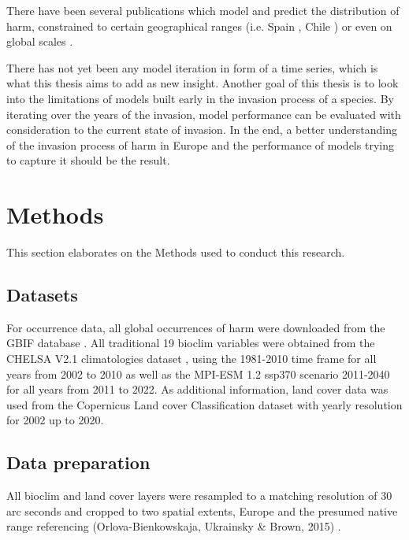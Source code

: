 \documentclass[12pt,a4paper]{article}
\begin{document}
There have been several publications which model and predict the distribution of \gls{harm}, constrained to certain geographical ranges (i.e. Spain \autocite{ameixa2019harmSDMSpain}, Chile \autocite{alaniz2018harmSDMChile}) or even on global scales \autocite{bidinger2012harmSDMglobalMaxent, poutsma2008harmSDMglobalClimex}.

There has not yet been any model iteration in form of a time series, which is what this thesis aims to add as new insight.
Another goal of this thesis is to look into the limitations of models built early in the invasion process of a species.
By iterating over the years of the invasion, model performance can be evaluated with consideration to the current state of invasion.
In the end, a better understanding of the invasion process of \gls{harm} in Europe and the performance of models trying to capture it should be the result.



\newpage
\section{Methods}
This section elaborates on the Methods used to conduct this research.

\subsection{Datasets}
For occurrence data, all global occurrences of \gls{harm} were downloaded from the GBIF database \autocite{GBIFaxyridisdataset}.
All traditional 19 bioclim variables were obtained from the CHELSA V2.1 climatologies dataset \autocite{karger2017CHELSApaper, CHELSAbioclimdataset}, using the 1981-2010 time frame for all years from 2002 to 2010 as well as the MPI-ESM 1.2 ssp370 scenario 2011-2040 for all years from 2011 to 2022.
As additional information, land cover data was used from the Copernicus Land cover Classification dataset \autocite{COPlandcoverdataset}  with yearly resolution for 2002 up to 2020.

\subsection{Data preparation}
All bioclim and land cover layers were resampled to a matching resolution of 30 arc seconds and cropped to two spatial extents, Europe and the presumed native range referencing (Orlova-Bienkowskaja, Ukrainsky \& Brown, 2015) \autocite{orlova2015harmonia}.
\end{document}
